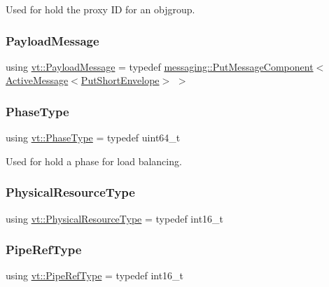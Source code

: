 Used for hold the proxy ID for an objgroup. 

\mbox{\label{namespacevt_a89a92229c5622b855c02c549f83a1a68}} 
\subsubsection{\texorpdfstring{Payload\+Message}{PayloadMessage}}
{\footnotesize\ttfamily using \hyperlink{namespacevt_a89a92229c5622b855c02c549f83a1a68}{vt\+::\+Payload\+Message} = typedef \hyperlink{structvt_1_1messaging_1_1_put_message_component}{messaging\+::\+Put\+Message\+Component}$<$ \hyperlink{namespacevt_a00eb67bd138395b6a4f744fab3fa0678}{Active\+Message}$<$\hyperlink{namespacevt_a4e561211bbf1d8d9a4766eb159852736}{Put\+Short\+Envelope}$>$ $>$}

\mbox{\label{namespacevt_a46ce6733d5cdbd735d561b7b4029f6d7}} 
\subsubsection{\texorpdfstring{Phase\+Type}{PhaseType}}
{\footnotesize\ttfamily using \hyperlink{namespacevt_a46ce6733d5cdbd735d561b7b4029f6d7}{vt\+::\+Phase\+Type} = typedef uint64\+\_\+t}



Used for hold a phase for load balancing. 

\mbox{\label{namespacevt_a2dc36fcada816dc6d11774d650328ee9}} 
\subsubsection{\texorpdfstring{Physical\+Resource\+Type}{PhysicalResourceType}}
{\footnotesize\ttfamily using \hyperlink{namespacevt_a2dc36fcada816dc6d11774d650328ee9}{vt\+::\+Physical\+Resource\+Type} = typedef int16\+\_\+t}

\mbox{\label{namespacevt_ace18d74dd489d9ea506d38789fffce34}} 
\subsubsection{\texorpdfstring{Pipe\+Ref\+Type}{PipeRefType}}
{\footnotesize\ttfamily using \hyperlink{namespacevt_ace18d74dd489d9ea506d38789fffce34}{vt\+::\+Pipe\+Ref\+Type} = typedef int16\+\_\+t}



